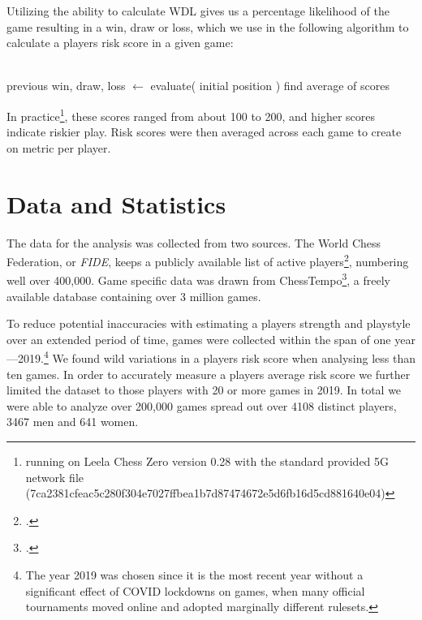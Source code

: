 \documentclass[letterpaper, 11pt]{article}
\begin{document}
        Utilizing the ability to calculate WDL gives us a percentage likelihood of the game resulting in a win, draw or loss, which we use in the following algorithm to calculate a players risk score in a given game: \\ \\ 
        \begin{algorithm}[H]
            previous win, draw, loss $\gets$ evaluate( initial position )\;
            find average of scores\;
        \end{algorithm}
        \hfill \break
        \noindent In practice\footnote{running on Leela Chess Zero version 0.28 with the standard provided 5G network file\\ (7ca2381cfeac5c280f304e7027ffbea1b7d87474672e5d6fb16d5cd881640e04)}, these scores ranged from about 100 to 200, and higher scores indicate riskier play. 
        Risk scores were then averaged across each game to create on metric per player.


    \section*{Data and Statistics}
        The data for the analysis was collected from two sources.
        The World Chess Federation, or \emph{FIDE}, keeps a publicly available list of active players\footcite{fide-ratings}, numbering well over 400,000.
        Game specific data was drawn from ChessTempo\footcite{chesstempo}, a freely available database containing over 3 million games.

        To reduce potential inaccuracies with estimating a players strength and playstyle over an extended period of time, games were collected within the span of one year---2019.\footnote{The year 2019 was chosen since it is the most recent year without a significant effect of COVID lockdowns on games, when many official tournaments moved online and adopted marginally different rulesets.}
        We found wild variations in a players risk score when analysing less than ten games. 
        In order to accurately measure a players average risk score we further limited the dataset to those players with 20 or more games in 2019.
        In total we were able to analyze over 200,000 games spread out over 4108 distinct players, 3467 men and 641 women.
\end{document}
